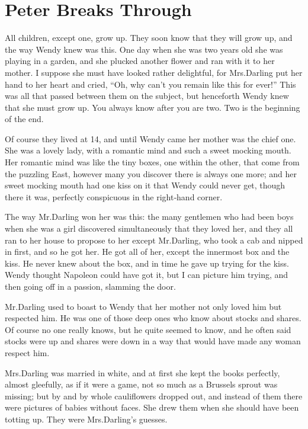 
\chapter{Peter Breaks Through}

All children, except one, grow up.
They soon know that they will grow up,
and the way Wendy knew was this.
One day when she was two years old she was playing in a garden,
and she plucked another flower and ran with it to her mother.
I suppose she must have looked rather delightful,
for Mrs.\@ Darling put her hand to her heart and cried,
“Oh, why can’t you remain like this for ever!”
This was all that passed between them on the subject,
but henceforth Wendy knew that she must grow up.
You always know after you are two.
Two is the beginning of the end.

Of course they lived at 14,
and until Wendy came her mother was the chief one.
She was a lovely lady, with a romantic mind and such a sweet mocking mouth.
Her romantic mind was like the tiny boxes, one within the other, that come from the puzzling East,
however many you discover there is always one more;
and her sweet mocking mouth had one kiss on it that Wendy could never get,
though there it was, perfectly conspicuous in the right‐hand corner.

The way Mr.\@ Darling won her was this:
the many gentlemen who had been boys when she was a girl discovered simultaneously that they loved her,
and they all ran to her house to propose to her
except Mr.\@ Darling, who took a cab and nipped in first, and so he got her.
He got all of her, except the innermost box and the kiss.
He never knew about the box, and in time he gave up trying for the kiss.
Wendy thought Napoleon could have got it,
but I can picture him trying, and then going off in a passion, slamming the door.

Mr.\@ Darling used to boast to Wendy that her mother not only loved him but respected him.
He was one of those deep ones who know about stocks and shares.
Of course no one really knows, but he quite seemed to know,
and he often said stocks were up and shares were down in a way that would have made any woman respect him.

Mrs.\@ Darling was married in white,
and at first she kept the books perfectly, almost gleefully, as if it were a game,
not so much as a Brussels sprout was missing;
but by and by whole cauliflowers dropped out,
and instead of them there were pictures of babies without faces.
She drew them when she should have been totting up.
They were Mrs.\@ Darling’s guesses.

